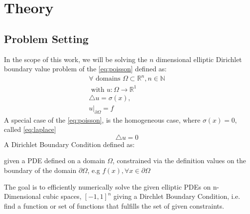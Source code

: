 \chapter{Theory}
\label{chapter:Theory}
%

\section{Problem Setting}
In the scope of this work, we will be solving the $n$ dimensional elliptic Dirichlet boundary
value problem of the
\ref{eq:poisson} defined as:
  \begin{equation}\tag{Poisson's Equation}
  \begin{split}
\forall \text{ domains } \Omega \subset
  \mathbb{R}^{n}, n \in \mathbb{N} \\ \text{ with }u\colon \Omega \rightarrow \mathbb{R}^{1}\\
  \bigtriangleup u = \sigma(x),
  \label{eq:poisson}
  \\ u\rvert_{\partial \Omega} = f
\end{split}
\end{equation}
A special case of the \ref{eq:poisson}, is the homogeneous case, where $\sigma(x) = 0$, called
\ref{eq:laplace}
  \begin{equation}
    \tag{Laplace's Equation}
    \bigtriangleup u = 0
    \label{eq:laplace}
  \end{equation}
A Dirichlet Boundary Condition defined as:
\begin{definition}
given a \Gls{PDE}
defined on a domain $\Omega$, constrained via the definition values on the
 boundary of the domain $\partial \Omega$, e.g $f(x), \forall  x \in \partial \Omega$
\end{definition}
The goal is to efficiently numerically solve the given elliptic \Glspl{PDE}
on n-Dimensional cubic spaces, $[-1,1]^{n}$ giving a Dirchlet
Boundary Condition, i.e. find a function or set of functions that fulfills the set of given constraints.
